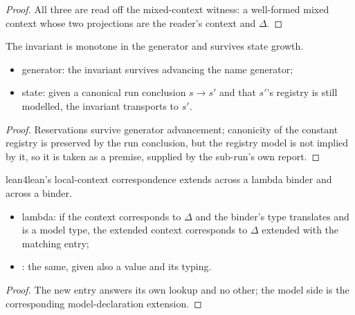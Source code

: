 \begin{proof}
\leanok
{}
 All three are read off the mixed-context witness: a well-formed mixed context whose two
projections are the reader's context and $\Delta$.
\end{proof}
\begin{lemma}
\label{lem:BridgeInv-mono}
\leanok
{}
 The invariant is monotone in the generator and survives state growth.
\begin{itemize}
\item generator: the invariant survives advancing the name generator;
\item state: given a canonical run conclusion $s \to s'$ and that $s'$'s registry is still modelled,
the invariant transports to $s'$.
\end{itemize}
\end{lemma}
\begin{proof}
\leanok
{}
 Reservations survive generator advancement; canonicity of the constant registry is preserved
by the run conclusion, but the registry model is not implied by it, so it is taken as a premise, supplied
by the sub-run's own report.
\end{proof}
\begin{lemma}
\label{lem:TrLCtx-mkLocalDecl}
\leanok
{}
 lean4lean's local-context correspondence extends across a lambda binder and across a
 binder.
\begin{itemize}
\item lambda: if the context corresponds to $\Delta$ and the binder's type translates and is a model
type, the extended context corresponds to $\Delta$ extended with the matching entry;
\item {}: the same, given also a value and its typing.
\end{itemize}
\end{lemma}
\begin{proof}
\leanok
{}
 The new entry answers its own lookup and no other; the model side is the corresponding
model-declaration extension.
\end{proof}
